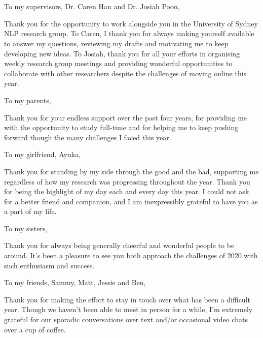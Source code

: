 \chapter*{}

To my supervisors, Dr. Caren Han and Dr. Josiah Poon,

Thank you for the opportunity to work alongside you in the University of Sydney NLP research group. To Caren, I thank you for always making yourself available to answer my questions, reviewing my drafts and motivating me to keep developing new ideas. To Josiah, thank you for all your efforts in organising weekly research group meetings and providing wonderful opportunities to collaborate with other researchers despite the challenges of moving online this year.

\vspace{\baselineskip}

To my parents,

Thank you for your endless support over the past four years, for providing me with the opportunity to study full-time and for helping me to keep pushing forward though the many challenges I faced this year.

\vspace{\baselineskip}

To my girlfriend, Ayuka,

Thank you for standing by my side through the good and the bad, supporting me regardless of how my research was progressing throughout the year. Thank you for being the highlight of my day each and every day this year. I could not ask for a better friend and companion, and I am inexpressibly grateful to have you as a part of my life.

\vspace{\baselineskip}

To my sisters,

Thank you for always being generally cheerful and wonderful people to be around. It's been a pleasure to see you both approach the challenges of 2020 with such enthusiasm and success.

\vspace{\baselineskip}

To my friends, Sammy, Matt, Jessie and Ben,

Thank you for making the effort to stay in touch over what has been a difficult year. Though we haven't been able to meet in person for a while, I'm extremely grateful for our sporadic conversations over text and/or occasional video chats over a cup of coffee.
